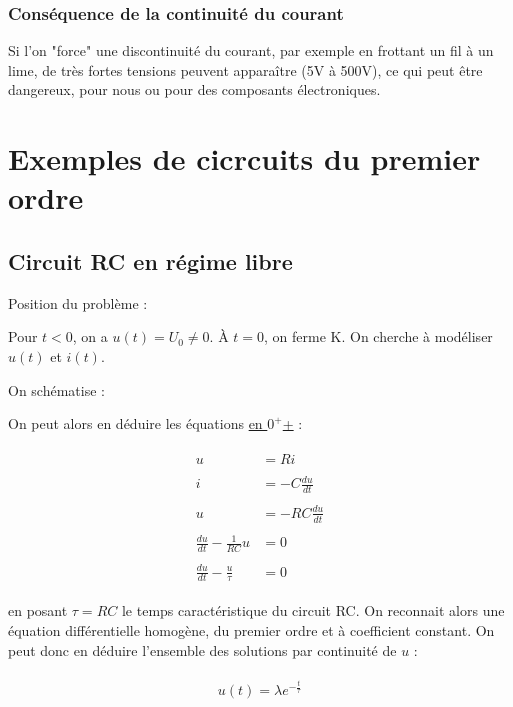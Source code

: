 \documentclass{article}
\begin{document}
\subsubsection*{Conséquence de la continuité du courant}

Si l'on "force" une discontinuité du courant, par exemple en frottant un fil à un lime, de très fortes tensions peuvent apparaître (5V à 500V), ce qui peut être dangereux, pour nous ou pour des composants électroniques.

\newpage
{}
\section{Exemples de cicrcuits du premier ordre}

\subsection{Circuit RC en régime libre}

Position du problème :


Pour $t<0$, on a $u(t)=U_0 \neq 0$. À $t=0$, on ferme K. On cherche à modéliser $u(t)$ et $i(t)$.

\bigskip

On schématise :


On peut alors en déduire les équations \underline{en $0^+$+} :

\begin{align*}\begin{split}
u&=Ri\\\\
i&=-C\frac{du}{dt}\\\\
u&=-RC\frac{du}{dt}\\\\
\frac{du}{dt}-\frac{1}{RC}u&=0\\\\
\frac{du}{dt}-\frac{u}{\tau}&=0
\end{split}\end{align*}

en posant $\tau=RC$ le temps caractéristique du circuit RC. On reconnait alors une équation différentielle homogène, du premier ordre et à coefficient constant. On peut donc en déduire l'ensemble des solutions par continuité de $u$ :

\begin{align*}\begin{split}
u(t)=\lambda e^{-\frac{t}{\tau}}
\end{split}\end{align*}
\end{document}
